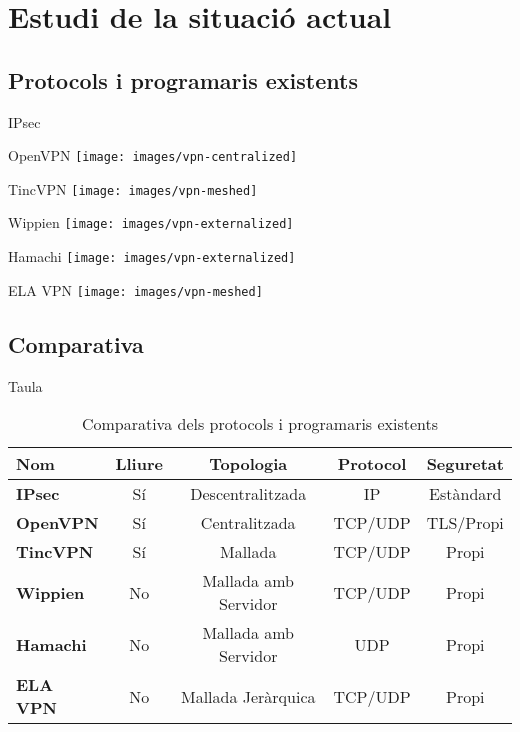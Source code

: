 \section{Estudi de la situació actual}
\subsection{Protocols i programaris existents}
\begin{frame}{IPsec}
\end{frame}
\begin{frame}{OpenVPN}
\texttt{[image: images/vpn-centralized]}
\end{frame}
\begin{frame}{TincVPN}
\texttt{[image: images/vpn-meshed]}
\end{frame}
\begin{frame}{Wippien}
\texttt{[image: images/vpn-externalized]}
\end{frame}
\begin{frame}{Hamachi}
\texttt{[image: images/vpn-externalized]}
\end{frame}
\begin{frame}{ELA VPN}
\texttt{[image: images/vpn-meshed]}
\end{frame}

\subsection{Comparativa}
\begin{frame}{Taula}
\begin{table}[htb]
\begin{center}
\begin{tabular}{|l|c|c|c|c|}
\hline
Nom & Lliure & Topologia & Protocol & Seguretat \\ \hline \hline
\bf IPsec & Sí & Descentralitzada & IP & Estàndard \\ \hline
\bf OpenVPN & Sí & Centralitzada & TCP/UDP & TLS/Propi \\ \hline
\bf TincVPN & Sí & Mallada & TCP/UDP & Propi \\ \hline
\bf Wippien & No & Mallada amb Servidor & TCP/UDP & Propi \\ \hline
\bf Hamachi & No & Mallada amb Servidor & UDP & Propi \\ \hline
\bf ELA VPN & No & Mallada Jeràrquica & TCP/UDP & Propi \\ \hline
\end{tabular}
\end{center}
\begin{center}
\caption{Comparativa dels protocols i programaris existents}
\end{center}
\end{table}
\end{frame}
